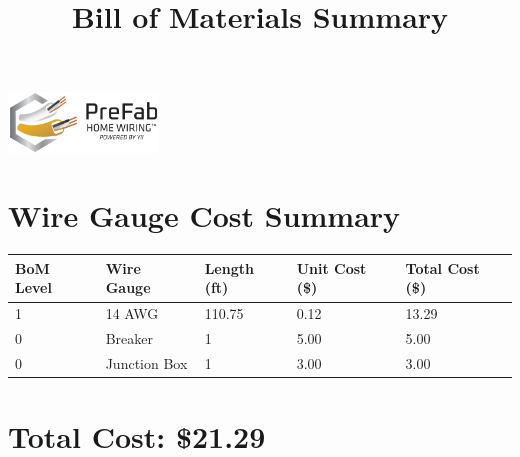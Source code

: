 \documentclass{article}
\title{Bill of Materials Summary}
\begin{document}
\begin{center}
\includegraphics[width=0.3\textwidth]{logo.png}
\end{center}
\maketitle

\section*{Wire Gauge Cost Summary}
\begin{tabular}{lllll}
\toprule
\textbf{BoM Level} & \textbf{Wire Gauge} & \textbf{Length (ft)} & \textbf{Unit Cost (\$)} & \textbf{Total Cost (\$)} \\
\midrule
1 & 14 AWG & 110.75 & 0.12 & 13.29 \\
\midrule
0 & Breaker & 1 & 5.00 & 5.00 \\
0 & Junction Box & 1 & 3.00 & 3.00 \\
\bottomrule
\end{tabular}

\section*{Total Cost: \$21.29}
\end{document}

